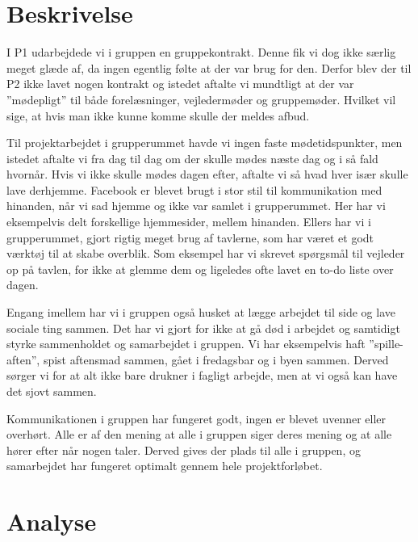 \section{Beskrivelse}
I P1 udarbejdede vi i gruppen en gruppekontrakt. Denne fik vi dog ikke særlig meget glæde af, da ingen egentlig følte at der var brug for den. Derfor blev der til P2 ikke lavet nogen kontrakt og istedet aftalte vi mundtligt at der var ”mødepligt” til både forelæsninger, vejledermøder og gruppemøder. Hvilket vil sige, at hvis man ikke kunne komme skulle der meldes afbud.

Til projektarbejdet i grupperummet havde vi ingen faste mødetidspunkter, men istedet aftalte vi fra dag til dag om der skulle mødes næste dag og i så fald hvornår. Hvis vi ikke skulle mødes dagen efter, aftalte vi så hvad hver især skulle lave derhjemme.
Facebook er blevet brugt i stor stil til kommunikation med hinanden, når vi sad hjemme og ikke var samlet i grupperummet. Her har vi eksempelvis delt forskellige hjemmesider, mellem hinanden. 
Ellers har vi i grupperummet, gjort rigtig meget brug af tavlerne, som har været et godt værktøj til at skabe overblik. Som eksempel har vi skrevet spørgsmål til vejleder op på tavlen, for ikke at glemme dem og ligeledes ofte lavet en to-do liste over dagen. 

Engang imellem har vi i gruppen også husket at lægge arbejdet til side og lave sociale ting sammen. Det har vi gjort for ikke at gå død i arbejdet og samtidigt styrke sammenholdet og samarbejdet i gruppen. Vi har eksempelvis haft ”spille-aften”, spist aftensmad sammen, gået i fredagsbar og i byen sammen. Derved sørger vi for at alt ikke bare drukner i fagligt arbejde, men at vi også kan have det sjovt sammen.

Kommunikationen i gruppen har fungeret godt, ingen er blevet uvenner eller overhørt. Alle er af den mening at alle i gruppen siger deres mening og at alle hører efter når nogen taler. Derved gives der plads til alle i gruppen, og  samarbejdet har fungeret optimalt gennem hele projektforløbet.

\section{Analyse}

